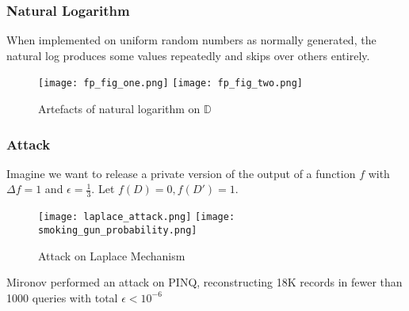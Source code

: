 \documentclass{beamer}
\begin{document}
\begin{frame}
    \frametitle{Natural Logarithm}
    When implemented on uniform random numbers as normally generated, the natural log produces some values repeatedly and skips over others entirely. \cite{Mir12}
    \begin{figure}
        \texttt{[image: fp\_fig\_one.png]}
        \hfill
        \texttt{[image: fp\_fig\_two.png]}
        \caption{Artefacts of natural logarithm on $\mathbb{D}$ \cite{Mir12}}
    \end{figure}
\end{frame}

\begin{frame}
    \frametitle{Attack}
    Imagine we want to release a private version of the output of a function $f$ with $\Delta f = 1$ and $\epsilon = \frac{1}{3}$.
    Let $f(D) = 0, f(D') = 1$.
    \begin{figure}
        \texttt{[image: laplace\_attack.png]}
        \hfill
        \texttt{[image: smoking\_gun\_probability.png]}
        \caption{Attack on Laplace Mechanism \cite{Mir12}}
    \end{figure}
    Mironov performed an attack on PINQ, reconstructing 18K records in fewer
    than 1000 queries with total $\epsilon < 10^{-6}$
\end{frame}
\end{document}
